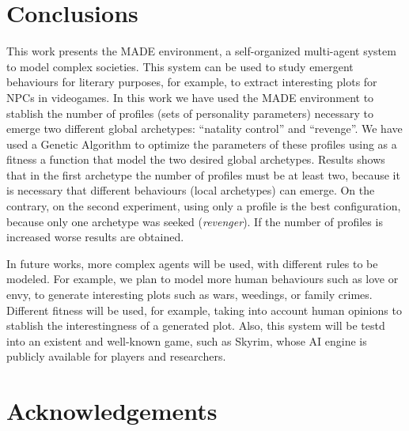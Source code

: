 \documentclass[runningheads]{llncs}
\begin{document}


\section{Conclusions}
\label{sec:conclusion}

This work presents the MADE environment, a self-organized multi-agent system to model complex societies. This system can be used to study emergent behaviours for literary purposes, for example, to extract interesting plots for NPCs in videogames. In this work we have used the MADE environment to stablish the number of profiles (sets of personality parameters) necessary to emerge two different global archetypes: ``natality control'' and ``revenge''. We have used a Genetic Algorithm to optimize the parameters of these profiles using as a fitness a function that model the two desired global archetypes. Results shows that in the first archetype the number of profiles must be at least two, because it is necessary that different behaviours (local archetypes) can emerge. On the contrary, on the second experiment, using only a profile is the best configuration, because only one archetype was seeked ({\em revenger}). If the number of profiles is increased worse results are obtained.

In future works, more complex agents will be used, with different rules to be modeled. For example, we plan to model more human behaviours such as love or envy, to generate interesting plots such as wars, weedings, or family crimes. Different fitness will be used, for example, taking into account human opinions to stablish the interestingness of a generated plot. Also, this system will be testd into an existent and well-known game, such as Skyrim\texttrademark, whose AI engine is publicly available for players and researchers.


\section*{Acknowledgements}



\end{document}

